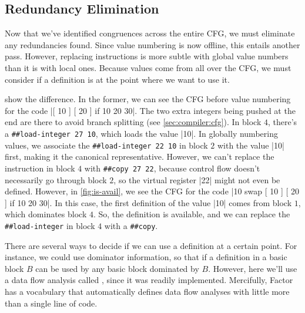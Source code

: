 \subsection{Redundancy Elimination}\label{sec:vn:avail}

Now that we've identified congruences across the entire \gls{CFG}, we must
eliminate any redundancies found.  Since value numbering is now offline, this
entails another pass.  However, replacing instructions is more subtle with
global value numbers than it is with local ones.  Because values come from all
over the \gls{CFG}, we must consider if a definition is  at the
point where we want to use it.  


 show the difference.  In the former, we can
see the \gls{CFG} before value numbering for the code
%
\factor|[ 10 ] [ 20 ] if 10 20 30|.
%
The two extra integers being pushed at the end are there to avoid branch
splitting (see \vref{sec:compiler:cfg}).  In block $4$, there's a
%
\Verb|##load-integer 27 10|,
%
which loads the value \factor|10|.  In globally numbering values, we associate
the
%
\Verb|##load-integer 22 10|
%
in block $2$ with the value \factor|10| first, making it the canonical
representative.  However, we can't replace the instruction in block $4$ with
%
\Verb|##copy 27 22|,
%
because control flow doesn't necessarily go through block $2$, so the virtual
register \factor|22| might not even be defined.  However, in
\vref{fig:is-avail}, we see the \gls{CFG} for the code
%
\factor|10 swap [ 10 ] [ 20 ] if 10 20 30|.
%
In this case, the first definition of the value \factor|10| comes from block
$1$, which dominates block $4$.  So, the definition is available, and we can
replace the \Verb|##load-integer| in block $4$ with a \Verb|##copy|.

There are several ways to decide if we can use a definition at a certain point.
For instance, we could use dominator information, so that if a definition in a
basic block $B$ can be used by any basic block dominated by $B$.  However, here we'll use a data flow analysis called , since it was readily implemented.  Mercifully, Factor has
a vocabulary that automatically defines data flow analyses with little more
than a single line of code.


